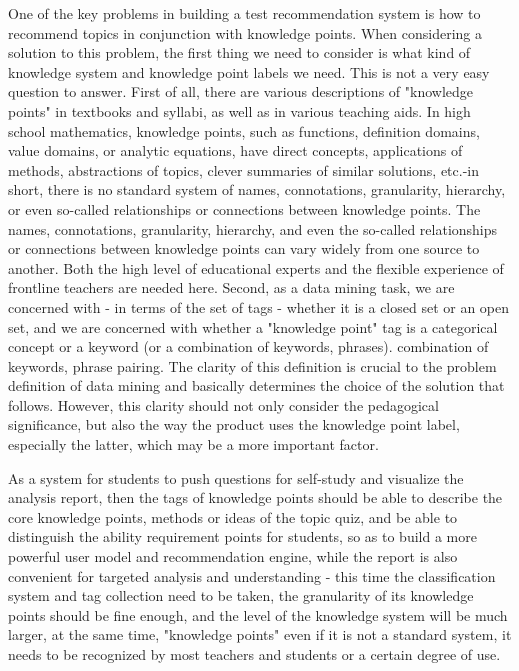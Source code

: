 One of the key problems in building a test recommendation system is how to recommend topics in conjunction with knowledge points. When considering a solution to this problem, the first thing we need to consider is what kind of knowledge system and knowledge point labels we need. This is not a very easy question to answer. First of all, there are various descriptions of "knowledge points" in textbooks and syllabi, as well as in various teaching aids. In high school mathematics, knowledge points, such as functions, definition domains, value domains, or analytic equations, have direct concepts, applications of methods, abstractions of topics, clever summaries of similar solutions, etc.-in short, there is no standard system of names, connotations, granularity, hierarchy, or even so-called relationships or connections between knowledge points. The names, connotations, granularity, hierarchy, and even the so-called relationships or connections between knowledge points can vary widely from one source to another. Both the high level of educational experts and the flexible experience of frontline teachers are needed here. Second, as a data mining task, we are concerned with - in terms of the set of tags - whether it is a closed set or an open set, and we are concerned with whether a "knowledge point" tag is a categorical concept or a keyword (or a combination of keywords, phrases). combination of keywords, phrase pairing. The clarity of this definition is crucial to the problem definition of data mining and basically determines the choice of the solution that follows. However, this clarity should not only consider the pedagogical significance, but also the way the product uses the knowledge point label, especially the latter, which may be a more important factor.

As a system for students to push questions for self-study and visualize the analysis report, then the tags of knowledge points should be able to describe the core knowledge points, methods or ideas of the topic quiz, and be able to distinguish the ability requirement points for students, so as to build a more powerful user model and recommendation engine, while the report is also convenient for targeted analysis and understanding - this time the classification system and tag collection need to be taken, the granularity of its knowledge points should be fine enough, and the level of the knowledge system will be much larger, at the same time, "knowledge points" even if it is not a standard system, it needs to be recognized by most teachers and students or a certain degree of use.

